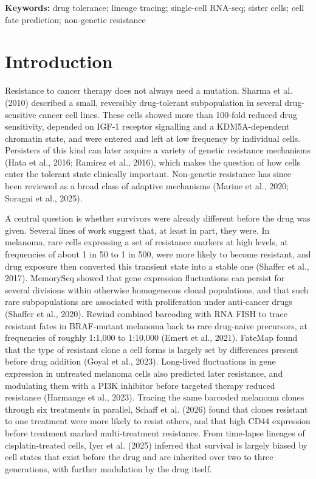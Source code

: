\documentclass[11pt,a4paper]{article}
\begin{document}
\textbf{Keywords:} drug tolerance; lineage tracing; single-cell RNA-seq; sister cells; cell fate prediction; non-genetic resistance

\section*{Introduction}

Resistance to cancer therapy does not always need a mutation. Sharma et al. (2010) described a small, reversibly drug-tolerant subpopulation in several drug-sensitive cancer cell lines. These cells showed more than 100-fold reduced drug sensitivity, depended on IGF-1 receptor signalling and a KDM5A-dependent chromatin state, and were entered and left at low frequency by individual cells. Persisters of this kind can later acquire a variety of genetic resistance mechanisms (Hata et al., 2016; Ramirez et al., 2016), which makes the question of how cells enter the tolerant state clinically important. Non-genetic resistance has since been reviewed as a broad class of adaptive mechanisms (Marine et al., 2020; Soragni et al., 2025).

A central question is whether survivors were already different before the drug was given. Several lines of work suggest that, at least in part, they were. In melanoma, rare cells expressing a set of resistance markers at high levels, at frequencies of about 1 in 50 to 1 in 500, were more likely to become resistant, and drug exposure then converted this transient state into a stable one (Shaffer et al., 2017). MemorySeq showed that gene expression fluctuations can persist for several divisions within otherwise homogeneous clonal populations, and that such rare subpopulations are associated with proliferation under anti-cancer drugs (Shaffer et al., 2020). Rewind combined barcoding with RNA FISH to trace resistant fates in BRAF-mutant melanoma back to rare drug-naive precursors, at frequencies of roughly 1:1,000 to 1:10,000 (Emert et al., 2021). FateMap found that the type of resistant clone a cell forms is largely set by differences present before drug addition (Goyal et al., 2023). Long-lived fluctuations in gene expression in untreated melanoma cells also predicted later resistance, and modulating them with a PI3K inhibitor before targeted therapy reduced resistance (Harmange et al., 2023). Tracing the same barcoded melanoma clones through six treatments in parallel, Schaff et al. (2026) found that clones resistant to one treatment were more likely to resist others, and that high CD44 expression before treatment marked multi-treatment resistance. From time-lapse lineages of cisplatin-treated cells, Iyer et al. (2025) inferred that survival is largely biased by cell states that exist before the drug and are inherited over two to three generations, with further modulation by the drug itself.
\end{document}
